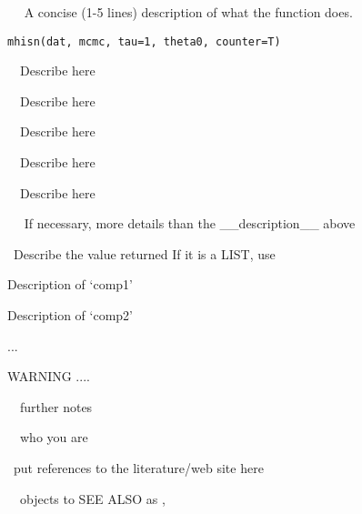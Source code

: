 \begin{Description}\relax
~~ A concise (1-5 lines) description of what the function does. ~~\end{Description}
\begin{Usage}
\begin{verbatim}
mhisn(dat, mcmc, tau=1, theta0, counter=T)
\end{verbatim}
\end{Usage}
\begin{Arguments}
\begin{ldescription}
\item[\code{dat}] ~~Describe  here~~ 
\item[\code{mcmc}] ~~Describe  here~~ 
\item[\code{tau}] ~~Describe  here~~ 
\item[\code{theta0}] ~~Describe  here~~ 
\item[\code{counter}] ~~Describe  here~~ 
\end{ldescription}
\end{Arguments}
\begin{Details}\relax
~~ If necessary, more details than the __description__  above ~~\end{Details}
\begin{Value}
~Describe the value returned
If it is a LIST, use
\begin{ldescription}
\item[\code{comp1 }] Description of `comp1'
\item[\code{comp2 }] Description of `comp2'
\end{ldescription}

...\end{Value}
\begin{Section}{WARNING}
....\end{Section}
\begin{Note}\relax
~~further notes~~\end{Note}
\begin{Author}\relax
~~who you are~~\end{Author}
\begin{References}\relax
~put references to the literature/web site here ~\end{References}
\begin{SeeAlso}\relax
~~objects to SEE ALSO as , ~~~\end{SeeAlso}

